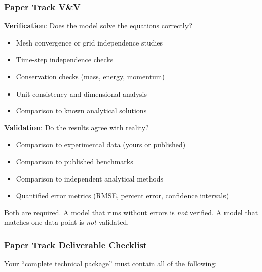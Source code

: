 \subsubsection{Paper Track V\&V}

\begin{faqbox}
\textbf{Verification}: Does the model solve the equations correctly?
\begin{itemize}[nosep,leftmargin=1.5em]
\item Mesh convergence or grid independence studies
\item Time-step independence checks
\item Conservation checks (mass, energy, momentum)
\item Unit consistency and dimensional analysis
\item Comparison to known analytical solutions
\end{itemize}

\textbf{Validation}: Do the results agree with reality?
\begin{itemize}[nosep,leftmargin=1.5em]
\item Comparison to experimental data (yours or published)
\item Comparison to published benchmarks
\item Comparison to independent analytical methods
\item Quantified error metrics (RMSE, percent error, confidence intervals)
\end{itemize}

Both are required. A model that runs without errors is \emph{not} verified. A model that matches one data point is \emph{not} validated.
\end{faqbox}

\subsubsection{Paper Track Deliverable Checklist}

Your ``complete technical package'' must contain all of the following:

